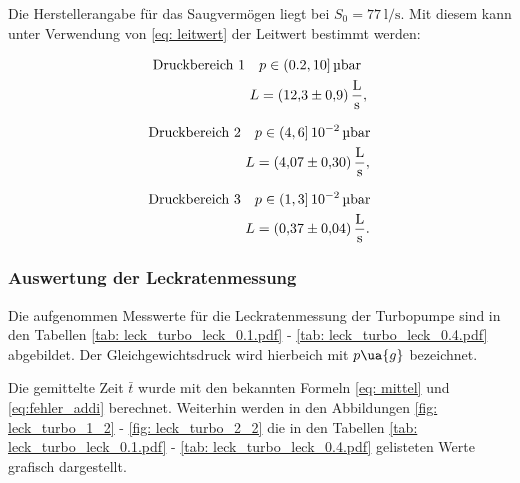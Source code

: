 Die Herstellerangabe für das Saugvermögen liegt bei $S_0=\SI{77}{\litre\per\second}$.
Mit diesem kann unter Verwendung von \eqref{eq: leitwert} der Leitwert bestimmt werden:

\begin{align}
  \label{eq:turbo_leit_1}
  \begin{aligned}
    \text{Druckbereich 1} \quad  &p\in(0.2,10]\,\si{\micro\bar} \\
   L&=\SI{12.3\pm 0.9}{\litre\per\second},
\end{aligned}
\end{align}

\begin{align}
  \label{eq:turbo_leit_2}
  \begin{aligned}
    \text{Druckbereich 2} \quad  &p\in(4,6]\,\num{e-2}\,\si{\micro\bar} \\
   L&=\SI{4.07\pm 0.30}{\litre\per\second},
\end{aligned}
\end{align}

\begin{align}
  \label{eq:turbo_leit_3}
  \begin{aligned}
    \text{Druckbereich 3} \quad  &p\in(1,3]\,\num{e-2}\,\si{\micro\bar} \\
   L&=\SI{0.37\pm 0.04}{\litre\per\second}.
\end{aligned}
\end{align}

\subsubsection{Auswertung der Leckratenmessung}

Die aufgenommen Messwerte für die Leckratenmessung der Turbopumpe sind in den Tabellen \ref{tab: leck_turbo_leck_0.1.pdf} - \ref{tab: leck_turbo_leck_0.4.pdf}
abgebildet. Der Gleichgewichtsdruck wird hierbeich mit $p\ua{g}$ bezeichnet.




Die gemittelte Zeit $\bar{t}$ wurde mit den bekannten Formeln \eqref{eq: mittel} und \eqref{eq:fehler_addi} berechnet.
Weiterhin werden in den Abbildungen \ref{fig: leck_turbo_1_2} - \ref{fig: leck_turbo_2_2} die in den Tabellen \ref{tab: leck_turbo_leck_0.1.pdf} - \ref{tab: leck_turbo_leck_0.4.pdf}
gelisteten Werte grafisch dargestellt.


